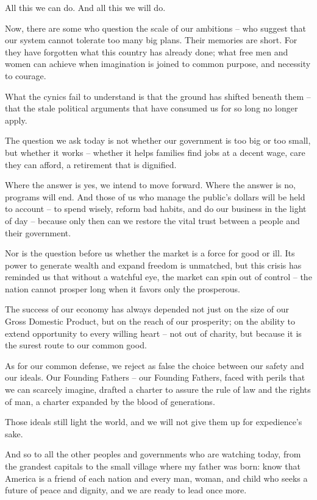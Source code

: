 All this we can do. And all this we will do.

Now, there are some who question the scale of our ambitions – who suggest that our system cannot tolerate too many big plans. Their memories are short. 
For they have forgotten what this country has already done; what free men and women can achieve when imagination is joined to common purpose, and 
necessity to courage.


What the cynics fail to understand is that the ground has shifted beneath them – that the stale political arguments that have consumed us for so long no longer apply.

The question we ask today is not whether our government is too big or too small, but whether it works – whether it helps families find jobs at a decent wage, 
care they can afford, a retirement that is dignified.

Where the answer is yes, we intend to move forward. Where the answer is no, programs will end. And those of us who manage the public’s dollars will be 
held to account – to spend wisely, reform bad habits, and do our business in the light of day – because only then can we restore the vital trust between a 
people and their government.

Nor is the question before us whether the market is a force for good or ill. Its power to generate wealth and expand freedom is unmatched, but this crisis has 
reminded us that without a watchful eye, the market can spin out of control – the nation cannot prosper long when it favors only the prosperous.


The success of our economy has always depended not just on the size of our Gross Domestic Product, but on the reach of our prosperity; on the ability to extend 
opportunity to every willing heart – not out of charity, but because it is the surest route to our common good.

As for our common defense, we reject as false the choice between our safety and our ideals. Our Founding Fathers – our Founding Fathers, faced 
with perils that we can scarcely imagine, drafted a charter to assure the rule of law and the rights of man, a charter expanded by the blood of generations.

Those ideals still light the world, and we will not give them up for expedience’s sake.

And so to all the other peoples and governments who are watching today, from the grandest capitals to the small village where my father was born: 
know that America is a friend of each nation and every man, woman, and child who seeks a future of peace and dignity, and we are ready to lead once more.


